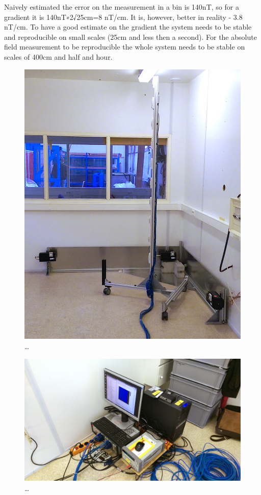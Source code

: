 Naively estimated the error on the measurement in a bin is 140nT, so for a gradient it is 140nT∗2√25cm=8 nT/cm. It is, however, better in reality - 3.8 nT/cm. To have a good estimate on the gradient the system needs to be stable and reproducible on small scales (25cm and less then a second). For the absolute field measurement to be reproducible the whole system needs to be stable on scales of 400cm and half and hour.

\begin{figure}
  \centering
  \includegraphics[width=0.9\linewidth]{gfx/mapping/lpsc/setup_edited.jpg}
  \caption{\ldots}
  \label{fig:mapping_bastille_setup}
\end{figure}

\begin{figure}
  \centering
  \includegraphics[width=0.9\linewidth]{gfx/mapping/lpsc/daq_edited.jpg}
  \caption{\ldots}
  \label{fig:mapping_bastille_daq}
\end{figure}

